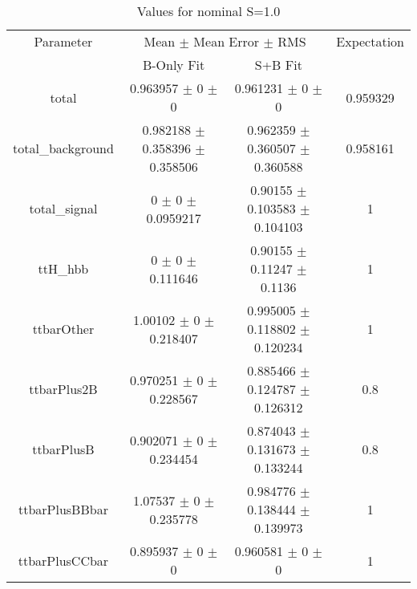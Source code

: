 \begin{table}
\centering
\caption{Values for nominal S=1.0}
\begin{tabular}{cccc}
\toprule
Parameter & \multicolumn{2}{c}{Mean $\pm$ Mean Error $\pm$ RMS} & Expectation\\
 & B-Only Fit & S+B Fit & \\
\midrule
total & \num{0.963957} $\pm$ \num{0} $\pm$ \num{0} & \num{0.961231} $\pm$ \num{0} $\pm$ \num{0} & \num{0.959329}\\
total\_background & \num{0.982188} $\pm$ \num{0.358396} $\pm$ \num{0.358506} & \num{0.962359} $\pm$ \num{0.360507} $\pm$ \num{0.360588} & \num{0.958161}\\
total\_signal & \num{0} $\pm$ \num{0} $\pm$ \num{0.0959217} & \num{0.90155} $\pm$ \num{0.103583} $\pm$ \num{0.104103} & \num{1}\\
ttH\_hbb & \num{0} $\pm$ \num{0} $\pm$ \num{0.111646} & \num{0.90155} $\pm$ \num{0.11247} $\pm$ \num{0.1136} & \num{1}\\
ttbarOther & \num{1.00102} $\pm$ \num{0} $\pm$ \num{0.218407} & \num{0.995005} $\pm$ \num{0.118802} $\pm$ \num{0.120234} & \num{1}\\
ttbarPlus2B & \num{0.970251} $\pm$ \num{0} $\pm$ \num{0.228567} & \num{0.885466} $\pm$ \num{0.124787} $\pm$ \num{0.126312} & \num{0.8}\\
ttbarPlusB & \num{0.902071} $\pm$ \num{0} $\pm$ \num{0.234454} & \num{0.874043} $\pm$ \num{0.131673} $\pm$ \num{0.133244} & \num{0.8}\\
ttbarPlusBBbar & \num{1.07537} $\pm$ \num{0} $\pm$ \num{0.235778} & \num{0.984776} $\pm$ \num{0.138444} $\pm$ \num{0.139973} & \num{1}\\
ttbarPlusCCbar & \num{0.895937} $\pm$ \num{0} $\pm$ \num{0} & \num{0.960581} $\pm$ \num{0} $\pm$ \num{0} & \num{1}\\
\bottomrule
\end{tabular}
\end{table}